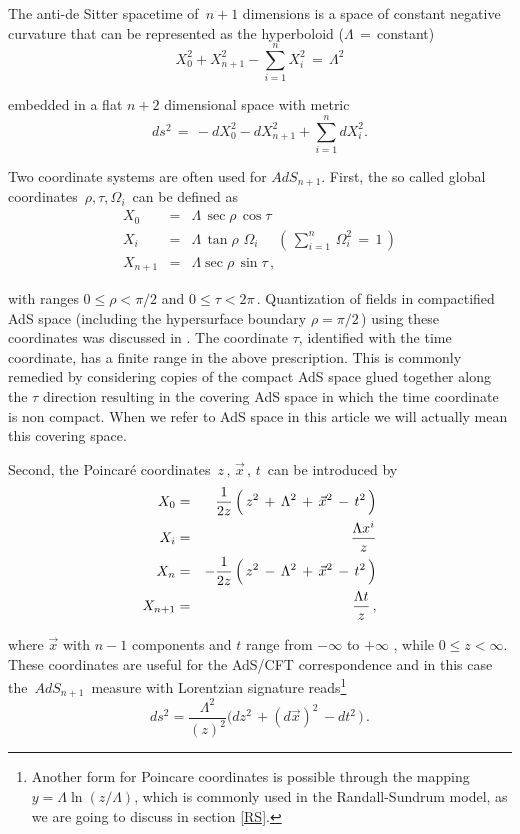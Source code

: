 \documentclass[a4paper,12pt]{article}
\begin{document}
The anti-de Sitter spacetime of $\,n+1$ dimensions is a space of 
constant negative curvature that can be represented 
as the hyperboloid ($\Lambda\,=\,$constant)
\begin{equation}
X_0^2 + X_{n+1}^2 - \sum_{i=1}^n X_i^2\,=\,\Lambda^2
\end{equation}

\noindent embedded in a flat $n+2$ dimensional space with metric
\begin{equation}
ds^2\,=\, - d X_0^2 - dX_{n+1}^2 + \sum_{i=1}^n dX_i^2.
\end{equation}

Two coordinate systems are often used for $AdS_{n+1}$. 
First, the  so called global coordinates $\,\rho,\tau,\Omega_i\,$  
can be defined as \cite{Malda2,Pe}
\begin{eqnarray}
\label{global}
X_0 &=& \Lambda \,\sec\rho\, \cos \tau \nonumber\\
X_i &=& \Lambda \,\tan \rho\, \,\Omega_i\,\,\,\,\,\,\,\,
(\,\sum_{i=1}^n \,\Omega^2_i\,=\,1\,) \nonumber\\
X_{n+1} &=& \Lambda \sec \rho \,\sin\tau \,,
\end{eqnarray}

\noindent with ranges $0\le \rho <\pi/2$ and $0\le\tau< 2\pi\,$.
Quantization of fields in  compactified AdS space (including  
the hypersurface boundary $\rho = \pi/2\,$) 
using these coordinates was discussed in \cite{QAdS1,QAdS2}. 
The coordinate $\tau$, identified with the time coordinate,
 has a finite range in the above prescription.
This is commonly remedied by considering copies of the compact AdS space
glued together along the $\tau $ direction resulting in the 
covering AdS space in which the time coordinate is non compact.
When we refer to AdS space in this article we will actually mean this
covering space. 



Second, the Poincar\'e coordinates 
$\,z \,,\,\vec x\,,\,t\,$ can be introduced by
\begin{eqnarray}
\label{Poincare}
X_0 &=& {1\over 2z}\,\Big( \,z^2\,+\,\Lambda^2\,
+\,{\vec x}^2\,-\,t^2\,\Big)
\nonumber\\
X_i &=& {\Lambda x^i \over z}
\nonumber\\
X_n &=& - {1\over 2z}\,
\Big( \,z^2\,-\,\Lambda^2\,+\,{\vec x}^2\,-\,t^2\,\Big)
\nonumber\\
X_{n+1} &=& {\Lambda t \over z}\,,
\end{eqnarray}

\noindent where $\vec x $ with $n-1$ components and  $t$
range from $-\infty $ to $+\infty$ , while $0 \le z < \infty $.
These coordinates are useful for the AdS/CFT correspondence 
\cite{GKP,Wi} and in this case the $\,AdS_{n+1}\,$ measure with 
Lorentzian signature reads\footnote{Another form for Poincare coordinates 
is possible through the mapping $y=\Lambda\ln(z/\Lambda)$, 
which is commonly used in the Randall-Sundrum model, 
as we are going to discuss in section \ref{RS}.}
\begin{equation}
\label{metric}
ds^2=\frac {\Lambda^2 }{( z )^2}\Big( dz^2 \,+(d\vec x)^2\,
- dt^2 \,\Big)\,.
 \end{equation}
\end{document}
